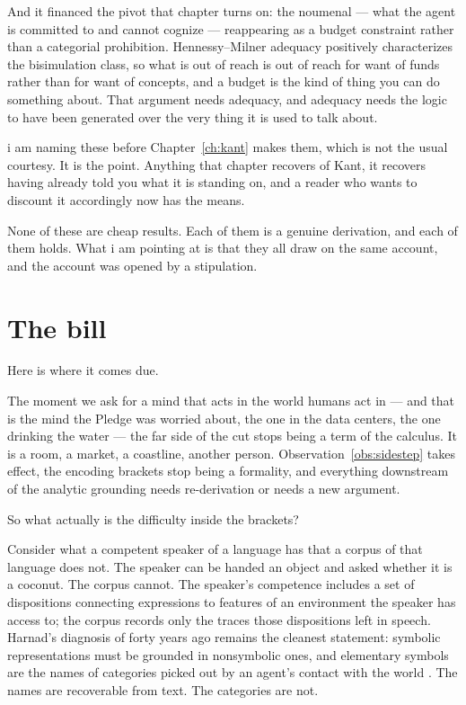 And it financed the pivot that chapter turns on: the noumenal ---
what the agent is committed to and cannot cognize --- reappearing
as a budget constraint rather than a categorial prohibition.
Hennessy--Milner adequacy positively characterizes the bisimulation
class, so what is out of reach is out of reach for want of funds
rather than for want of concepts, and a budget is the kind of thing
you can do something about.
That argument needs adequacy, and adequacy needs the logic to have
been generated over the very thing it is used to talk about.

i am naming these before Chapter~\ref{ch:kant} makes them, which is
not the usual courtesy.
It is the point.
Anything that chapter recovers of Kant, it recovers having already
told you what it is standing on, and a reader who wants to discount
it accordingly now has the means.

None of these are cheap results.
Each of them is a genuine derivation, and each of them holds.
What i am pointing at is that they all draw on the same account,
and the account was opened by a stipulation.

\section{The bill}
\label{sec:the-bill}

Here is where it comes due.

The moment we ask for a mind that acts in the world humans act in
--- and that is the mind the Pledge was worried about, the one in
the data centers, the one drinking the water --- the far side of
the cut stops being a term of the calculus.
It is a room, a market, a coastline, another person.
Observation~\ref{obs:sidestep} takes effect, the encoding brackets
stop being a formality, and everything downstream of the analytic
grounding needs re-derivation or needs a new argument.

So what actually is the difficulty inside the brackets?

Consider what a competent speaker of a language has that a corpus
of that language does not.
The speaker can be handed an object and asked whether it is a
coconut.
The corpus cannot.
The speaker's competence includes a set of dispositions connecting
expressions to features of an environment the speaker has access
to; the corpus records only the traces those dispositions left in
speech.
Harnad's diagnosis of forty years ago remains the cleanest
statement: symbolic representations must be grounded in nonsymbolic
ones, and elementary symbols are the names of categories picked out
by an agent's contact with the world \cite{harnad1990}.
The names are recoverable from text.
The categories are not.

